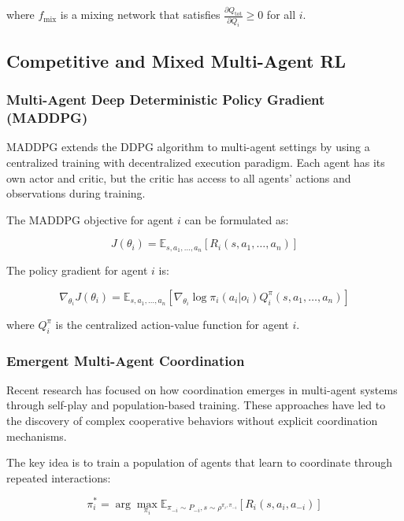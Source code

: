 \documentclass{article}
\begin{document}
where $f_{\text{mix}}$ is a mixing network that satisfies $\frac{\partial Q_{\text{tot}}}{\partial Q_i} \geq 0$ for all $i$.

\subsection{Competitive and Mixed Multi-Agent RL}

\subsubsection{Multi-Agent Deep Deterministic Policy Gradient (MADDPG)}

MADDPG extends the DDPG algorithm to multi-agent settings by using a centralized training with decentralized execution paradigm. Each agent has its own actor and critic, but the critic has access to all agents' actions and observations during training.

The MADDPG objective for agent $i$ can be formulated as:

\begin{equation}
J(\theta_i) = \mathbb{E}_{s, a_1, \ldots, a_n} [R_i(s, a_1, \ldots, a_n)]
\end{equation}

The policy gradient for agent $i$ is:

\begin{equation}
\nabla_{\theta_i} J(\theta_i) = \mathbb{E}_{s, a_1, \ldots, a_n} [\nabla_{\theta_i} \log \pi_i(a_i | o_i) Q_i^\pi(s, a_1, \ldots, a_n)]
\end{equation}

where $Q_i^\pi$ is the centralized action-value function for agent $i$.

\subsubsection{Emergent Multi-Agent Coordination}

Recent research has focused on how coordination emerges in multi-agent systems through self-play and population-based training. These approaches have led to the discovery of complex cooperative behaviors without explicit coordination mechanisms.

The key idea is to train a population of agents that learn to coordinate through repeated interactions:

\begin{equation}
\pi_i^* = \arg\max_{\pi_i} \mathbb{E}_{\pi_{-i} \sim P_{-i}, s \sim \rho^{\pi_i, \pi_{-i}}} [R_i(s, a_i, a_{-i})]
\end{equation}
\end{document}
